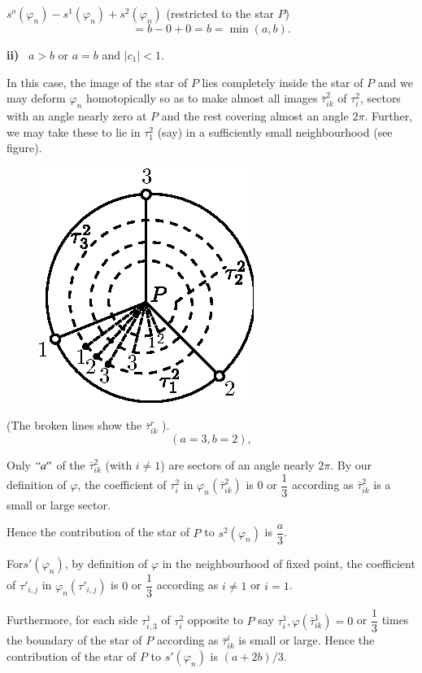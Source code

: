 $s^o (\varphi_n) - s^1 (\varphi_n) + s^2 (\varphi_n)$ (restricted to
the star $P$) 
$$
= b - 0 + 0 = b = \min  (a, b).
$$

\noindent
\textbf{ ii)}~ $a > b$ or $a = b$ and $|c_1| < 1$.

  In this case, the image of the star of $P$ lies completely inside the
  star of $P$ and we may deform $\varphi_n$ homotopically so as to make
  almost all images $\bar{\tau}^2_{ik}$ of $\tau^2_i$, sectors with an
  angle nearly zero at $P$ and the rest covering almost an angle $2
  \pi$. Further, we may take these to lie in $\tau^2_1$ (say) in a
  sufficiently small neighbourhood (see figure). 
   \begin{figure}[H]
    \centerline{\includegraphics{vol9-figures/fig9-19.eps}}
  \end{figure}

(The broken lines show the $\bar{\tau}^r_{ik}$ ).
$$
(a = 3, b = 2),
$$

Only  $``a''$ of the $\bar{\tau}^2_{ik}$ (with $i \neq 1$) are sectors
of an angle nearly $2 \pi $. By our definition of $\varphi$, the
coefficient of $\tau^2_i$ in $\varphi_n (\bar{\tau}^2_{ik})$ is $0$ or
$\dfrac{1}{3}$ according as $\bar{\tau}^2_{ik}$ is a small or large
sector. 

Hence the contribution of the star of $P$ to $s^2 (\varphi_n)$ is
$\dfrac{a}{3}$. 

For\pageoriginale $s' (\varphi_n)$, by definition of $\varphi$ in the neighbourhood
of fixed point, the coefficient of $\tau'_{i, j}$ in $\varphi_n
(\tau'_{i, j})$ is $0$ or $\dfrac{1}{3}$ according as $i \neq 1$ or
$i = 1$. 

Furthermore, for each side $\tau^1_{i, 3}$ of $\tau^2_{i}$ opposite
to $P$ say $\tau^1_i, \varphi(\bar{\tau}^1_{ik}) = 0$ or
$\dfrac{1}{3}$ times the boundary of the star of $P$ according as
$\bar{\tau}^i_{ik}$ is small or large. Hence the contribution of the
star of $P$ to $s' (\varphi_n)$ is $(a + 2 b)/3$. 

